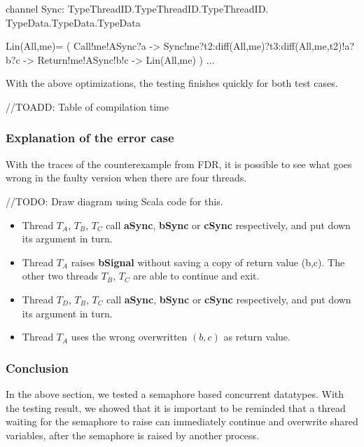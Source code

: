 \documentclass{article}
\begin{document}
\begin{cspm}
channel Sync: TypeThreadID.TypeThreadID.TypeThreadID.
              TypeData.TypeData.TypeData

Lin(All,me)= (
  Call!me!ASync?a ->
  Sync!me?t2:diff(All,{me})?t3:diff(All,{me,t2})!a?b?c ->
  Return!me!ASync!b!c ->
  Lin(All,me)
) ...
\end{cspm}

With the above optimizations, the testing finishes quickly for both test cases.

//TOADD: Table of compilation time

\subsubsection{Explanation of the error case}
With the traces of the counterexample from FDR, it is possible to see what goes wrong in the faulty version when there are four threads.

//TODO: Draw diagram using Scala code for this.
\begin{itemize}
  \item Thread $T_A$, $T_B$, $T_C$ call \textbf{aSync}, \textbf{bSync} or \textbf{cSync} respectively, and put down its argument in turn.
  \item Thread $T_A$ raises \textbf{bSignal} without saving a copy of   return value {(b,c)}. The other two threads $T_B$, $T_C$ are able   to continue and exit. 
  \item Thread $T_D$, $T_B$, $T_C$ call \textbf{aSync}, \textbf{bSync} or \textbf{cSync} respectively, and put down its argument in turn.
  \item Thread $T_A$ uses the wrong overwritten $(b,c)$ as return value. 
  
\end{itemize}

\subsubsection{Conclusion}
In the above section, we tested a semaphore based concurrent datatypes. With the testing result, we showed that it is important to be reminded that a thread waiting for the semaphore to raise can immediately continue and overwrite shared variables, after the semaphore is raised by another process.
\end{document}

